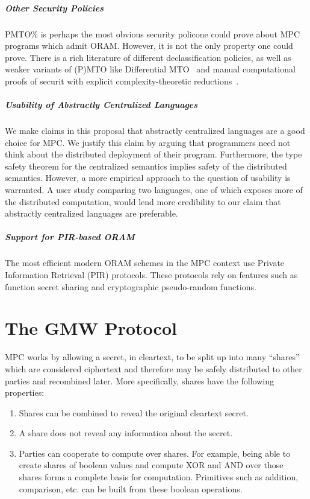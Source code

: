 \documentclass{report}
\begin{document}
\paragraph{Other Security Policies}
PMTO\% is perhaps the most obvious security policone could prove about MPC programs which admit ORAM. However, it is not the only property
one could prove. There is a rich literature of different declassification policies, as well as weaker variants of (P)MTO like Differential
MTO~\cite{} and manual computational proofs of securit with explicit complexity-theoretic reductions~\cite{easycrypt}.

\paragraph{Usability of Abstractly Centralized Languages}
We make claims in this proposal that abstractly centralized languages are a good choice for MPC. We justify this claim by arguing that
programmers need not think about the distributed deployment of their program. Furthermore, the type safety theorem for the centralized
semantics implies safety of the distributed semantics. However, a more empirical approach to the question of usability is warranted.
A user study comparing two languages, one of which exposes more of the distributed computation, would lend more credibility to our claim
that abstractly centralized languages are preferable.

\paragraph{Support for PIR-based ORAM}
The most efficient modern ORAM schemes in the MPC context use Private Information Retrieval (PIR) protocols. These protocols rely on
features such as function secret sharing and cryptographic pseudo-random functions.

\appendix

\chapter{The GMW Protocol}

MPC works by allowing a secret, in cleartext, to be split up into many ``shares'' which are considered ciphertext
and therefore may be safely distributed to other parties and recombined later. More specifically, shares have the following properties:
\begin{enumerate}
\item Shares can be combined to reveal the original cleartext secret.
\item A share does not reveal any information about the secret.
\item Parties can cooperate to compute over shares. For example, being able to create shares of boolean values
  and compute XOR and AND over those shares forms a complete basis for computation. Primitives such as addition,
  comparison, etc. can be built from these boolean operations.
\end{enumerate}
\end{document}
